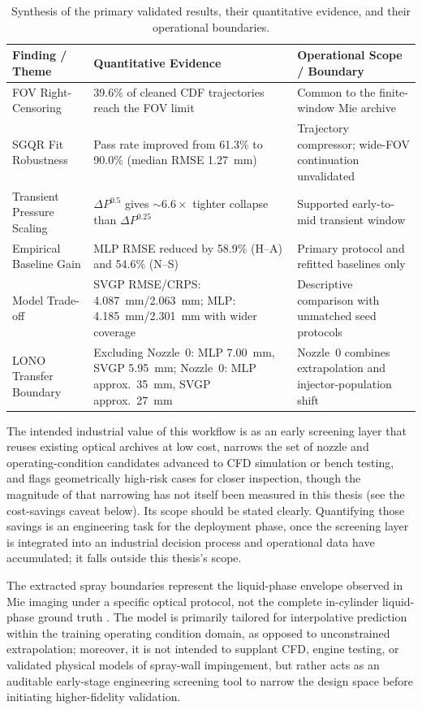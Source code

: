 \begin{table}[!ht]
\centering
\footnotesize
\setlength{\tabcolsep}{4pt}
\begin{tabularx}{\textwidth}{L{3.2cm} Y L{4.2cm}}
\toprule
Finding / Theme & Quantitative Evidence & Operational Scope / Boundary \\
\midrule
FOV Right-Censoring & 39.6\% of cleaned CDF trajectories reach the FOV limit & Common to the finite-window Mie archive \\
SGQR Fit Robustness & Pass rate improved from 61.3\% to 90.0\% (median RMSE \SI{1.27}{mm}) & Trajectory compressor; wide-FOV continuation unvalidated \\
Transient Pressure Scaling & \(\Delta P^{0.5}\) gives \(\sim6.6\times\) tighter collapse than \(\Delta P^{0.25}\) & Supported early-to-mid transient window \\
Empirical Baseline Gain & MLP RMSE reduced by 58.9\% (H--A) and 54.6\% (N--S) & Primary protocol and refitted baselines only \\
Model Trade-off & SVGP RMSE/CRPS: \SI{4.087}{mm}/\SI{2.063}{mm}; MLP: \SI{4.185}{mm}/\SI{2.301}{mm} with wider coverage & Descriptive comparison with unmatched seed protocols \\
LONO Transfer Boundary & Excluding Nozzle~0: MLP \SI{7.00}{mm}, SVGP \SI{5.95}{mm}; Nozzle~0: MLP approx.\ \SI{35}{mm}, SVGP approx.\ \SI{27}{mm} & Nozzle~0 combines extrapolation and injector-population shift \\
\bottomrule
\end{tabularx}
\caption{Synthesis of the primary validated results, their quantitative evidence, and their operational boundaries.}
\label{tab:discussion-validated-results}
\end{table}

The intended industrial value of this workflow is as an early screening layer that reuses existing optical archives at low cost, narrows the set of nozzle and operating-condition candidates advanced to CFD simulation or bench testing, and flags geometrically high-risk cases for closer inspection, though the magnitude of that narrowing has not itself been measured in this thesis (see the cost-savings caveat below).
Its scope should be stated clearly.
Quantifying those savings is an engineering task for the deployment phase, once the screening layer is integrated into an industrial decision process and operational data have accumulated; it falls outside this thesis's scope.

The extracted spray boundaries represent the liquid-phase envelope observed in Mie imaging under a specific optical protocol, not the complete in-cylinder liquid-phase ground truth \cite{ecn_liquid_penetration,ecn_liquid_penetration_accessory}.
The model is primarily tailored for interpolative prediction within the training operating condition domain, as opposed to unconstrained extrapolation;
moreover, it is not intended to supplant CFD, engine testing, or validated physical models of spray-wall impingement, but rather acts as an auditable early-stage engineering screening tool to narrow the design space before initiating higher-fidelity validation.

